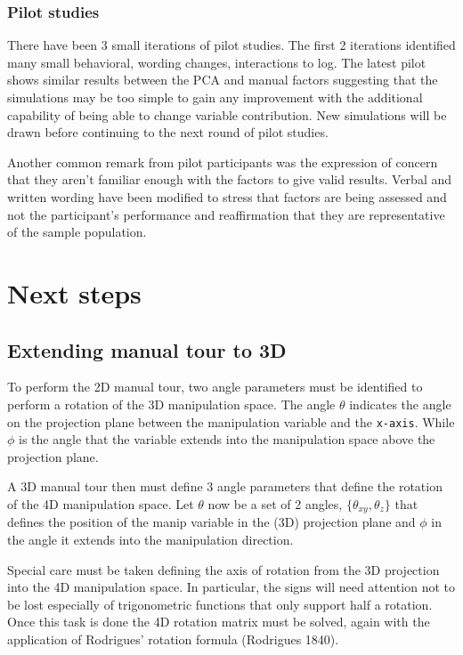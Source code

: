 \documentclass[
  11,
]{article}
\begin{document}
\hypertarget{pilot-studies}{%
\subsubsection{Pilot studies}\label{pilot-studies}}

There have been 3 small iterations of pilot studies. The first 2 iterations identified many small behavioral, wording changes, interactions to log. The latest pilot shows similar results between the PCA and manual factors suggesting that the simulations may be too simple to gain any improvement with the additional capability of being able to change variable contribution. New simulations will be drawn before continuing to the next round of pilot studies.

Another common remark from pilot participants was the expression of concern that they aren't familiar enough with the factors to give valid results. Verbal and written wording have been modified to stress that factors are being assessed and not the participant's performance and reaffirmation that they are representative of the sample population.

\hypertarget{next-steps}{%
\section{Next steps}\label{next-steps}}

\hypertarget{extending-manual-tour-to-3d}{%
\subsection{Extending manual tour to 3D}\label{extending-manual-tour-to-3d}}

To perform the 2D manual tour, two angle parameters must be identified to perform a rotation of the 3D manipulation space. The angle \(\theta\) indicates the angle on the projection plane between the manipulation variable and the \texttt{x-axis}. While \(\phi\) is the angle that the variable extends into the manipulation space above the projection plane.

A 3D manual tour then must define 3 angle parameters that define the rotation of the 4D manipulation space. Let \(\theta\) now be a set of 2 angles, \(\{\theta_{xy}, \theta_z\}\) that defines the position of the manip variable in the (3D) projection plane and \(\phi\) in the angle it extends into the manipulation direction.

Special care must be taken defining the axis of rotation from the 3D projection into the 4D manipulation space. In particular, the signs will need attention not to be lost especially of trigonometric functions that only support half a rotation. Once this task is done the 4D rotation matrix must be solved, again with the application of Rodrigues' rotation formula (Rodrigues 1840).
\end{document}
